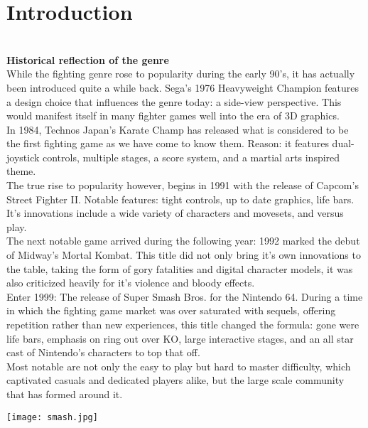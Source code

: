 \documentclass{article}
\begin{document}
\newpage

\chapter{\textbf{Introduction}}\\
\textbf{Historical reflection of the genre} \cite{jeffdunn2012:1}\\
While the fighting genre rose to popularity during the early 90's, it has actually been introduced quite a while back. Sega's 1976 Heavyweight Champion features a design choice that influences the genre today: a side-view perspective. This would manifest itself in many fighter games well into the era of 3D graphics.\\
In 1984, Technos Japan's Karate Champ has released what is considered to be the first fighting game as we have come to know them. Reason: it features dual-joystick controls, multiple stages, a score system, and a martial arts inspired theme.\\
The true rise to popularity however, begins in 1991 with the release of Capcom's Street Fighter II. Notable features: tight controls, up to date graphics, life bars. It's innovations include a wide variety of characters and movesets, and versus play.\\
The next notable game arrived during the following year: 1992 marked the debut of Midway's Mortal Kombat. This title did not only bring it's own innovations to the table, taking the form of gory fatalities and digital character models, it was also criticized heavily for it's violence and bloody effects.\\
Enter 1999: The release of Super Smash Bros. for the Nintendo 64. During a time in which the fighting game market was over saturated with sequels, offering repetition rather than new experiences, this title changed the formula: gone were life bars, emphasis on ring out over KO, large interactive stages, and an all star cast of Nintendo's characters to top that off.\\
Most notable are not only the easy to play but hard to master difficulty, which captivated casuals and dedicated players alike, but the large scale community that has formed around it.\\
\begin{center}
	\texttt{[image: smash.jpg]}
\end{center}
\end{document}
